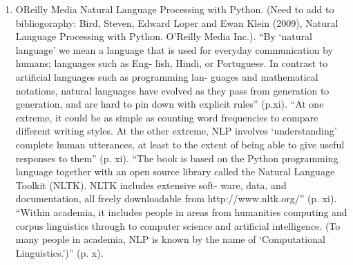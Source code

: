 \documentclass[12pt]{article}
\begin{document}
\begin{enumerate}
\item OReilly Media Natural Language Processing with Python. (Need to add to bibliogoraphy: Bird, Steven, Edward Loper and Ewan Klein (2009), Natural Language Processing with Python. O’Reilly Media Inc.). 
``By `natural language' we mean a language that is used for everyday communication by humans; languages such as Eng- lish, Hindi, or Portuguese. In contrast to artificial languages such as programming lan- guages and mathematical notations, natural languages have evolved as they pass from generation to generation, and are hard to pin down with explicit rules'' (p.xi). 
``At one extreme, it could be as simple as counting word frequencies to compare different writing styles. At the other extreme, NLP involves `understanding' complete human utterances, at least to the extent of being able to give useful responses to them'' (p. xi).
``The book is based on the Python programming language together with an open source library called the Natural Language Toolkit (NLTK). NLTK includes extensive soft- ware, data, and documentation, all freely downloadable from http://www.nltk.org/'' (p. xi). 
``Within academia, it includes people in areas from humanities computing and corpus linguistics through to computer science and artificial intelligence. (To many people in academia, NLP is known by the name of `Computational Linguistics.')'' (p. x).


\end{enumerate}
\end{document}
